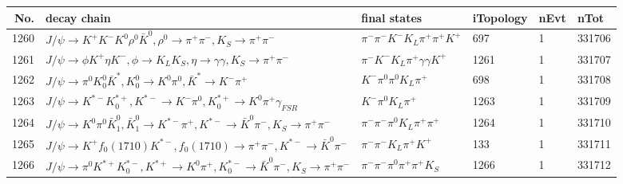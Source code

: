 \begin{table}[htbp] 
\begin{center}
\begin{small}
\begin{tabular}{rlllll}\hline\hline
 No. & decay chain & final states &  iTopology & nEvt & nTot \\\hline
1260&$J/\psi       \rightarrow K^{+}          K^{-}          K^{0}          \rho^{0}      \bar{K}^{0}   , \rho^{0}       \rightarrow \pi^{+}        \pi^{-}        , K_{S}           \rightarrow \pi^{+}        \pi^{-}        $&$\pi^{-}        \pi^{-}        K^{-}          K_{L}          \pi^{+}        \pi^{+}        K^{+}          $&  697&    1&331706\\
1261&$J/\psi       \rightarrow \phi           K^{+}          \eta          K^{-}          , \phi            \rightarrow K_{L}          K_{S}          , \eta           \rightarrow \gamma       \gamma       , K_{S}           \rightarrow \pi^{+}        \pi^{-}        $&$\pi^{-}        K^{-}          K_{L}          \pi^{+}        \gamma       \gamma       K^{+}          $& 1261&    1&331707\\
1262&$J/\psi       \rightarrow \pi^{0}        K_0^{0}        \bar{K}^{*}   , K_0^{0}         \rightarrow K^{0}          \pi^{0}        , \bar{K}^{*}    \rightarrow K^{-}          \pi^{+}        $&$K^{-}          \pi^{0}        \pi^{0}        K_{L}          \pi^{+}        $&  698&    1&331708\\
1263&$J/\psi       \rightarrow K^{*-}         K_{0}^{*+}     , K^{*-}          \rightarrow K^{-}          \pi^{0}        , K_{0}^{*+}      \rightarrow K^{0}          \pi^{+}        \gamma_{FSR} $&$K^{-}          \pi^{0}        K_{L}          \pi^{+}        $& 1263&    1&331709\\
1264&$J/\psi       \rightarrow K^{0}          \pi^{0}        \bar{K}_1^{0} , \bar{K}_1^{0}  \rightarrow K^{*-}         \pi^{+}        , K^{*-}          \rightarrow \bar{K}^{0}   \pi^{-}        , K_{S}           \rightarrow \pi^{+}        \pi^{-}        $&$\pi^{-}        \pi^{-}        \pi^{0}        K_{L}          \pi^{+}        \pi^{+}        $& 1264&    1&331710\\
1265&$J/\psi       \rightarrow K^{+}          f_{0}(1710)    K^{*-}         , f_{0}(1710)     \rightarrow \pi^{+}        \pi^{-}        , K^{*-}          \rightarrow \bar{K}^{0}   \pi^{-}        $&$\pi^{-}        \pi^{-}        K_{L}          \pi^{+}        K^{+}          $&  133&    1&331711\\
1266&$J/\psi       \rightarrow \pi^{0}        K^{*+}         K_{0}^{*-}     , K^{*+}          \rightarrow K^{0}          \pi^{+}        , K_{0}^{*-}      \rightarrow \bar{K}^{0}   \pi^{-}        , K_{S}           \rightarrow \pi^{+}        \pi^{-}        $&$\pi^{-}        \pi^{-}        \pi^{0}        \pi^{+}        \pi^{+}        K_{S}          $& 1266&    1&331712\\

\end{tabular}
\end{small}
\end{center}
\end{table}
